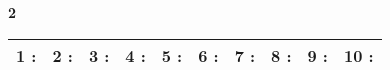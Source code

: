 \documentclass[a4paper, 11pt]{article}
\begin{document}
{\Large\bf 2 } \hspace{1.5cm}
\begin{tabular}{| l|l|l|l|l|l|l|l|l|l| }
\hline
{\large 1 }: \hspace*{0.5cm}
& {\large 2 }: \hspace*{0.5cm}
& {\large 3 }: \hspace*{0.5cm}
& {\large 4 }: \hspace*{0.5cm}
& {\large 5 }: \hspace*{0.5cm}
& {\large 6 }: \hspace*{0.5cm}
& {\large 7 }: \hspace*{0.5cm}
& {\large 8 }: \hspace*{0.5cm}
& {\large 9 }: \hspace*{0.5cm}
& {\large 10 }: \hspace*{0.5cm}
\\ 
 \hline
\end{tabular}
\vspace*{1cm} 
\end{document}
